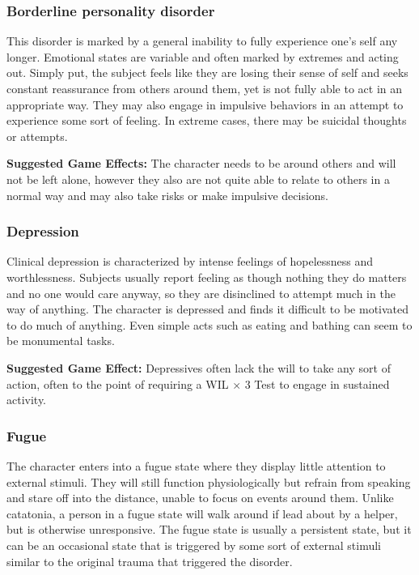 \subsubsection{Borderline personality disorder} 

This disorder is marked by a general inability to fully experience one’s self any longer. Emotional states are variable and often marked by extremes and acting out. Simply put, the subject feels like they are losing their sense of self and seeks constant reassurance from others around them, yet is not fully able to act in an appropriate way. They may also engage in impulsive behaviors in an attempt to experience some sort of feeling. In extreme cases, there may be suicidal thoughts or attempts. 

\textbf{Suggested Game Effects:} The character needs to be around others and will not be left alone, however they also are not quite able to relate to others in a normal way and may also take risks or make impulsive decisions. 

\subsubsection{Depression} 

Clinical depression is characterized by intense feelings of hopelessness and worthlessness. Subjects usually report feeling as though nothing they do matters and no one would care anyway, so they are disinclined to attempt much in the way of anything. The character is depressed and finds it difficult to be motivated to do much of anything. Even simple acts such as eating and bathing can seem to be monumental tasks. 

\textbf{Suggested Game Effect:} Depressives often lack the will to take any sort of action, often to the point of requiring a WIL $\times$ 3 Test to engage in sustained activity. 

\subsubsection{Fugue} 

The character enters into a fugue state where they display little attention to external stimuli. They will still function physiologically but refrain from speaking and stare off into the distance, unable to focus on events around them. Unlike catatonia, a person in a fugue state will walk around if lead about by a helper, but is otherwise unresponsive. The fugue state is usually a persistent state, but it can be an occasional state that is triggered by some sort of external stimuli similar to the original trauma that triggered the disorder. 

